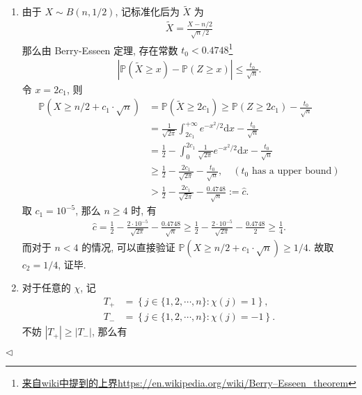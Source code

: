 \documentclass[11pt]{article}
\newenvironment{answer}[1][Solution]{\begin{trivlist}
    \item[\hskip \labelsep {\bfseries #1.}\hskip \labelsep]}{\hfill$\lhd$\end{trivlist}}
\newcommand\1{\mathds{1}}
\newcommand\PP{\mathbb{P}}
\newcommand\dd{\mathrm{d}}
\begin{document}
\begin{answer}
    \begin{enumerate}[label=(\arabic*)]
        \item 由于 $X\sim B(n, 1/2)$, 记标准化后为 $\widetilde{X}$ 为
        \begin{align*}
            \widetilde{X} = \frac{X - n/2}{\sqrt{n}/2} 
        \end{align*}
        那么由 Berry-Esseen 定理, 存在常数 $t_0 < 0.4748$\footnote{\href{https://en.wikipedia.org/wiki/Berry–Esseen_theorem}{来自wiki中提到的上界https://en.wikipedia.org/wiki/Berry–Esseen\_theorem}} 
        \begin{align*}
            \left|\PP(\widetilde{X} \ge x) - \PP(Z\ge x) \right| \le \frac{t_0}{\sqrt{n}}.
        \end{align*}
        令 $x = 2c_1$, 则
        \begin{align*}
            \PP(X\ge n/2 + c_1 \cdot \sqrt{n}) &= \PP(\widetilde{X} \ge 2c_1) \ge \PP(Z\ge 2c_1) - \frac{t_0}{\sqrt{n}} \\
            &= \frac{1}{\sqrt{2\pi}} \int_{2c_1}^{+\infty} e^{-x^2/2} \dd x  - \frac{t_0}{\sqrt{n}} \\
            &= \frac{1}{2}  - \int_{0}^{2c_1} \frac{1}{\sqrt{2\pi}} e^{-x^2/2} \dd x - \frac{t_0}{\sqrt{n}} \\
            &\ge \frac{1}{2} - \frac{2c_1}{\sqrt{2\pi}} - \frac{t_0}{\sqrt{n}}, \quad (t_0 \text{ has a upper bound}) \\
            &> \frac{1}{2} - \frac{2c_1}{\sqrt{2\pi}} - \frac{0.4748}{\sqrt{n}} := \hat{c}.
        \end{align*}
        取 $c_1 = 10^{-5}$, 那么 $n \ge 4$ 时, 有  
        \begin{align*}
            \hat{c} = \frac{1}{2} - \frac{2\cdot 10^{-5}}{\sqrt{2\pi}} - \frac{0.4748}{\sqrt{n}} \ge \frac{1}{2} - \frac{2\cdot 10^{-5}}{\sqrt{2\pi}} - \frac{0.4748}{2} \ge \frac{1}{4}.
        \end{align*}
        而对于 $n< 4$ 的情况, 可以直接验证 $\PP(X\ge n/2 + c_1 \cdot \sqrt{n}) \ge 1/4$. 故取 $c_2 = 1/4$, 证毕.
        \item 对于任意的 $\chi$, 记
        \begin{align*}
            T_+ &= \left\{j\in \{1,2,\cdots, n\}: \chi(j) = 1\right\}, \\
            T_- &= \left\{j\in \{1,2,\cdots, n\}: \chi(j) = -1\right\}.
        \end{align*}
        不妨 $|T_+| \ge |T_-|$, 那么有

\end{enumerate}
\end{answer}
\end{document}

